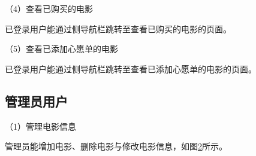 \documentclass{bjfuthesis}
\begin{document}
\begin{figure}
	\label{fig:general-details}
\end{figure}

\noindent （4）查看已购买的电影

已登录用户能通过侧导航栏跳转至查看已购买的电影的页面。

\noindent （5）查看已添加心愿单的电影

已登录用户能通过侧导航栏跳转至查看已添加心愿单的电影的页面。
\subsection{管理员用户}
\noindent （1）管理电影信息

管理员能增加电影、删除电影与修改电影信息，如图\ref{fig:admin-movie}所示。
\begin{figure}
	\label{fig:admin-movie}
\end{figure}
\end{document}
